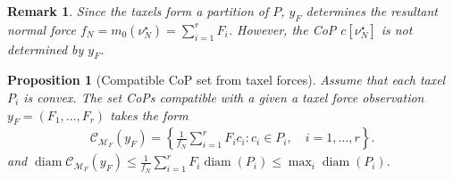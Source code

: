 \documentclass[11pt,a4paper]{article}
\theoremstyle{proposition}
\newtheorem{proposition}[theorem]{Proposition}
\newtheorem{remark}[theorem]{Remark}
\begin{document}
\begin{remark}
     Since the taxels form a partition of $P$, $y_F$ determines the resultant normal force $f_N=m_0(\nu_N^\star) = \sum_{i=1}^r F_i$. However, the CoP $c[\nu_N^\star]$ is not determined by $y_F$.
\end{remark}

\begin{proposition}[Compatible CoP set from taxel forces]
\label{prop:cop_taxel}
    Assume that each taxel $P_i$ is convex. The set CoPs compatible with a given a taxel force observation $y_F = (F_1,...,F_r)$ takes the form
    \begin{align}
        \mathcal C_{\mathcal M_F}(y_F)
        =
        \left\{
        \frac{1}{f_N}
        \sum_{i=1}^r F_i c_i
        :
        c_i\in P_i,\quad i=1,\ldots,r
        \right\}.
    \end{align}
    and $\operatorname{diam} \mathcal C_{\mathcal M_F}(y_F)\le\frac{1}{f_N}\sum_{i=1}^r F_i\operatorname{diam}(P_i)\le\max_i\operatorname{diam}(P_i).$
\end{proposition}
\end{document}
